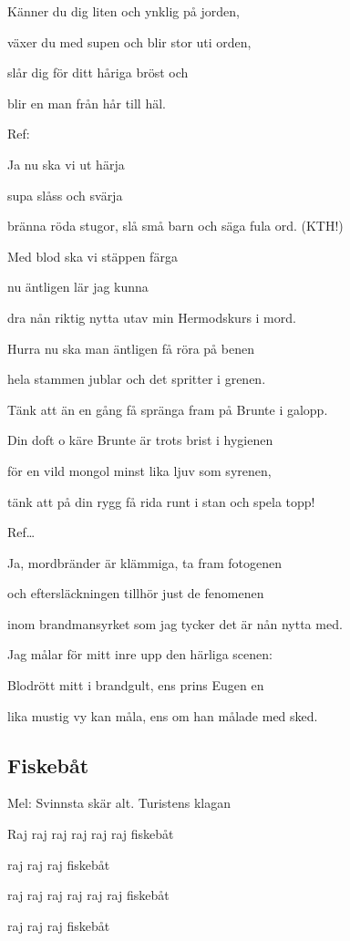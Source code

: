 Känner du dig liten och ynklig på jorden,

växer du med supen och blir stor uti orden,

slår dig för ditt håriga bröst och

blir en man från hår till häl.\bigskip

Ref:

Ja nu ska vi ut härja

supa slåss och svärja

bränna röda stugor, slå små barn och säga 
fula ord. (KTH!)

Med blod ska vi stäppen färga

nu äntligen lär jag kunna

dra nån riktig nytta utav min Hermodskurs i 
mord.\bigskip

Hurra nu ska man äntligen få röra på benen

hela stammen jublar och det spritter i 
grenen.

Tänk att än en gång få spränga fram på 
Brunte i galopp.

Din doft o käre Brunte är trots brist i 
hygienen

för en vild mongol minst lika ljuv som 
syrenen,

tänk att på din rygg få rida runt i stan och 
spela topp!\bigskip

Ref…\bigskip

Ja, mordbränder är klämmiga, ta fram 
fotogenen

och eftersläckningen tillhör just de 
fenomenen

inom brandmansyrket som jag tycker det är 
nån nytta med.

Jag målar för mitt inre upp den härliga 
scenen:

Blodrött mitt i brandgult, ens prins Eugen en

lika mustig vy kan måla, ens om han målade med sked.\bigskip

\subsection{\textbf{Fiskebåt}}

Mel: Svinnsta skär alt. Turistens klagan\bigskip


Raj raj raj raj raj raj fiskebåt

raj raj raj fiskebåt

raj raj raj raj raj raj fiskebåt

raj raj raj fiskebåt\bigskip

